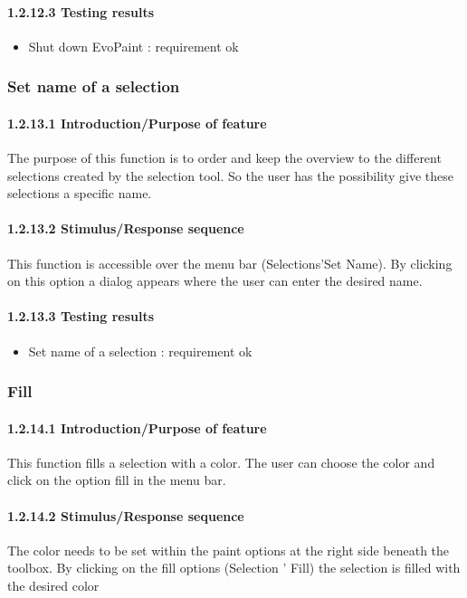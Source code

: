 \documentclass[titlepage,12pt]{scrartcl}
\begin{document}
\paragraph{1.2.12.3 Testing results}
\begin{itemize}
	\item Shut down EvoPaint 	: requirement ok
\end{itemize}

\subsubsection{Set name of a selection}
\paragraph{1.2.13.1 Introduction/Purpose of feature}
The purpose of this function is to order and keep the overview to the different selections created by the selection tool. So the user has the possibility give these selections a specific name.
\paragraph{1.2.13.2 Stimulus/Response sequence}
This function is accessible over the menu bar (Selections'Set Name). By clicking on this option a dialog appears where the user can enter the desired name.
\paragraph{1.2.13.3 Testing results}
\begin{itemize}
	\item Set name of a selection 	: requirement ok
\end{itemize}

\subsubsection{Fill}
\paragraph{1.2.14.1 Introduction/Purpose of feature}
This function fills a selection with a color. The user can choose the color and click on the option fill in the menu bar.
\paragraph{1.2.14.2 Stimulus/Response sequence}
The color needs to be set within the paint options at the right side beneath the toolbox. By clicking on the fill options (Selection ' Fill) the selection is filled with the desired color
\end{document}
